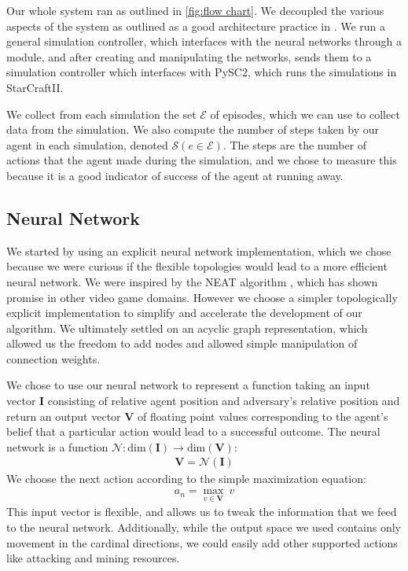 \documentclass{article}
\begin{document}
\begin{multicols}{2}
Our whole system ran as outlined in \ref{fig:flow chart}. We decoupled the
various aspects of the system as outlined as a good architecture practice in
\cite{pragprog}. We run a general simulation controller, which interfaces with
the neural networks through a module, and after creating and manipulating the
networks, sends them to a simulation controller which interfaces with PySC2,
which runs the simulations in StarCraftII.

We collect from each simulation the set $\bm{\mathcal{E}}$ of episodes, which we
can use to collect data from the simulation. We also compute the number of steps
taken by our agent in each simulation, denoted
$\mathcal{S}(e\in\bm{\mathcal{E}})$. The steps are the number of actions that
the agent made during the simulation, and we chose to measure this because it is
a good indicator of success of the agent at running away.

\subsection{Neural Network}
We started by using an explicit neural network implementation, which we chose
because we were curious if the flexible topologies would lead to a more
efficient neural network. We were inspired by the NEAT algorithm \cite{NEAT}, which has
shown promise in other video game domains. However we choose a simpler
topologically explicit implementation to simplify and accelerate the development
of our
algorithm. We ultimately settled on an acyclic graph representation, which
allowed us the freedom to add nodes and allowed simple manipulation of
connection weights.

We chose to use our neural network to represent a function taking an input
vector $\bm{I}$ consisting of relative agent position and adversary's relative
position and return an output vector $\bm{V}$ of floating point values
corresponding to the agent's belief that a particular action would lead to a
successful outcome. The neural network is a function
$\mathcal{N}:\text{dim}(\bm{I})\rightarrow\text{dim}(\bm{V})$:
\begin{align}
  \bm{V} = \mathcal{N}(\bm{I})
\end{align}
We choose the next action according to the simple maximization equation:
\begin{align}
  a_n = \max_{v \in \bm{V}} \: v
\end{align}
This input vector is flexible, and allows us to tweak the information that we
feed to the neural network. Additionally, while the output space we used
contains only movement in the cardinal directions, we could easily add other
supported actions like attacking and mining resources.


\end{multicols}
\end{document}
